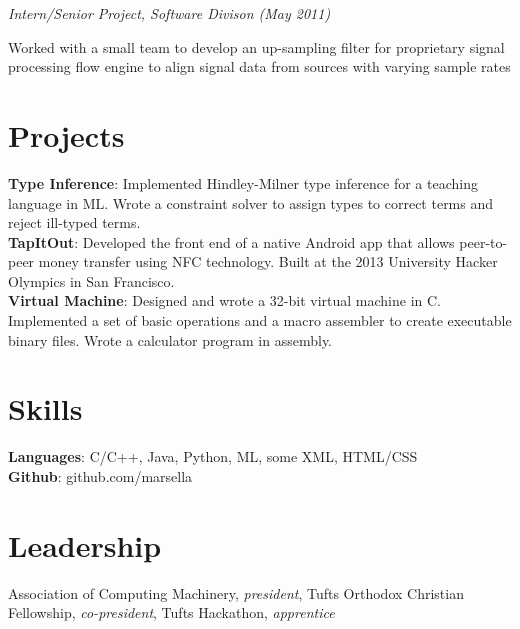 \documentclass{article}
\newcommand{\position}[2]{
  \textit{#1 (#2)}
}
\newenvironment{achievements}{
  \begin{compactitem} }{
  \end{compactitem}
}
\newcommand{\skill}[2]{
  \textbf{#1}: #2
}
\begin{document}
    \position {Intern/Senior Project, Software Divison} {May 2011}
    \begin{achievements}
      \item Worked with a small team to develop an up-sampling filter for
      proprietary signal processing flow engine to align signal data from sources
      with varying sample rates
    \end{achievements}

\section*{Projects}
  \skill{Type Inference}
        {Implemented Hindley-Milner type inference for a teaching language in
        ML. Wrote a constraint solver to assign types to correct terms and
        reject ill-typed terms.} \\
  \skill{TapItOut}
        {Developed the front end of a native Android app that allows
        peer-to-peer money transfer using NFC technology. Built at the 2013
        University Hacker Olympics in San Francisco.} \\
  \skill{Virtual Machine}
        {Designed and wrote a 32-bit virtual machine in C. Implemented a set of
        basic operations and a macro assembler to create executable binary
        files. Wrote a calculator program in assembly.}

\section*{Skills}
  \skill{Languages} {C/C++, Java, Python, ML, some XML, HTML/CSS} \\
  \skill{Github}    {github.com/marsella}

\section*{Leadership}
  Association of Computing Machinery, \textit{president}, Tufts Orthodox
  Christian Fellowship, \textit{co-president}, Tufts Hackathon,
  \textit{apprentice}
\end{document}

